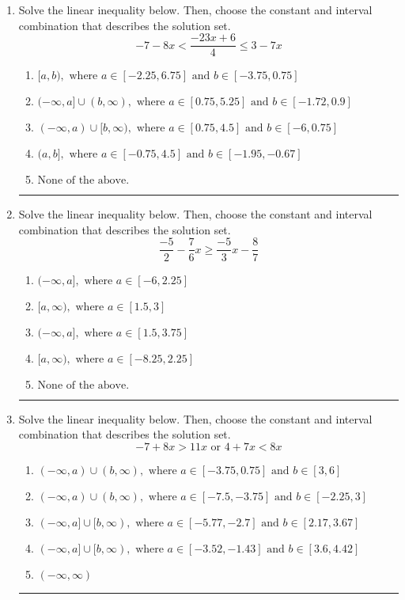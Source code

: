 \documentclass[14pt]{extbook}
\newcommand{\litem}[1]{\item#1\hspace*{-1cm}\rule{\textwidth}{0.4pt}}
\begin{document}
\begin{enumerate}
{\begin{enumerate}[label=\Alph*.]
\end{enumerate} }
\litem{
Solve the linear inequality below. Then, choose the constant and interval combination that describes the solution set.\[ -7 - 8 x < \frac{-23 x + 6}{4} \leq 3 - 7 x \]\begin{enumerate}[label=\Alph*.]
\item \( [a, b), \text{ where } a \in [-2.25, 6.75] \text{ and } b \in [-3.75, 0.75] \)
\item \( (-\infty, a] \cup (b, \infty), \text{ where } a \in [0.75, 5.25] \text{ and } b \in [-1.72, 0.9] \)
\item \( (-\infty, a) \cup [b, \infty), \text{ where } a \in [0.75, 4.5] \text{ and } b \in [-6, 0.75] \)
\item \( (a, b], \text{ where } a \in [-0.75, 4.5] \text{ and } b \in [-1.95, -0.67] \)
\item \( \text{None of the above.} \)

\end{enumerate} }
\litem{
Solve the linear inequality below. Then, choose the constant and interval combination that describes the solution set.\[ \frac{-5}{2} - \frac{7}{6} x \geq \frac{-5}{3} x - \frac{8}{7} \]\begin{enumerate}[label=\Alph*.]
\item \( (-\infty, a], \text{ where } a \in [-6, 2.25] \)
\item \( [a, \infty), \text{ where } a \in [1.5, 3] \)
\item \( (-\infty, a], \text{ where } a \in [1.5, 3.75] \)
\item \( [a, \infty), \text{ where } a \in [-8.25, 2.25] \)
\item \( \text{None of the above}. \)

\end{enumerate} }
\litem{
Solve the linear inequality below. Then, choose the constant and interval combination that describes the solution set.\[ -7 + 8 x > 11 x \text{ or } 4 + 7 x < 8 x \]\begin{enumerate}[label=\Alph*.]
\item \( (-\infty, a) \cup (b, \infty), \text{ where } a \in [-3.75, 0.75] \text{ and } b \in [3, 6] \)
\item \( (-\infty, a) \cup (b, \infty), \text{ where } a \in [-7.5, -3.75] \text{ and } b \in [-2.25, 3] \)
\item \( (-\infty, a] \cup [b, \infty), \text{ where } a \in [-5.77, -2.7] \text{ and } b \in [2.17, 3.67] \)
\item \( (-\infty, a] \cup [b, \infty), \text{ where } a \in [-3.52, -1.43] \text{ and } b \in [3.6, 4.42] \)
\item \( (-\infty, \infty) \)


\end{enumerate}}
\end{enumerate}
\end{document}
